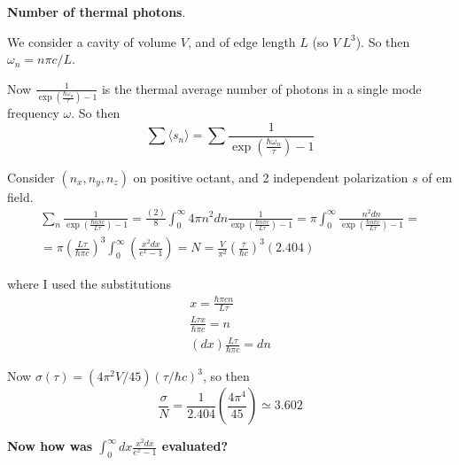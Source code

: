 \documentclass[twoside]{amsart}
\theoremstyle{plain}
\theoremstyle{definition}
\newcommand{\solutionhead}[1]
  {
   \noindent{\small\bf Solution #1.}
   }
\begin{document}
\solutionhead{1} \textbf{Number of thermal photons}.  

We consider a cavity of volume $V$, and of edge length $L$ (so $V ~ L^3$).  So then $\omega_n = n \pi c/L$.  

Now $\frac{1}{ \exp{ \left(  \frac{ \hbar \omega_n}{ \tau } \right) } - 1 }$ is the thermal average number of photons in a single mode frequency $\omega$.  So then
\[
\sum \langle s_n \rangle = \sum \frac{1}{ \exp{ \left( \frac{ \hbar \omega_n }{\tau} \right)} - 1 }
\]

Consider $(n_x, n_y, n_z)$ on positive octant, and 2 independent polarization $s$ of em field.  
\[
\begin{gathered}
  \sum_n \frac{1}{ \exp{ \left( \frac{ \hbar n \pi c}{ L \tau} \right) } - 1 } = \frac{ (2)}{ 8 } \int_0^{\infty} 4 \pi n^2 dn \frac{1}{ \exp{ \left( \frac{ \hbar n \pi c}{ L \tau } \right)} - 1 } = \pi \int_0^{\infty} \frac{ n^2 dn }{ \exp{ \left( \frac{ \hbar n \pi c}{ L \tau} \right)} - 1 } = \\
  = \pi \left( \frac{ L \tau }{ \hbar \pi c }\right)^3 \int_0^{\infty} \left( \frac{ x^2  dx}{ e^x - 1 } \right) = \boxed{ N = \frac{ V }{ \pi^2 } \left( \frac{ \tau }{ \hbar c} \right)^3 (2.404) }
\end{gathered}
\]

where I used the substitutions \[ \begin{gathered} x = \frac{ \hbar \pi c n}{ L \tau } \\ \frac{ L \tau x }{ \hbar \pi c} = n \\ (dx) \frac{ L \tau }{ \hbar \pi c} = dn \end{gathered} \]

Now $\sigma(\tau) = (4 \pi^2 V/ 45)(\tau / \hbar c)^3$, so then 
\[
\frac{ \sigma}{ N} = \frac{1}{2.404} \left( \frac{ 4 \pi^4}{ 45 } \right) \simeq \boxed{ 3.602 }
\]

\textbf{Now how was $\int_0^{\infty} dx \frac{ x^2 dx }{ e^x - 1 }$ evaluated?}  
\end{document}
